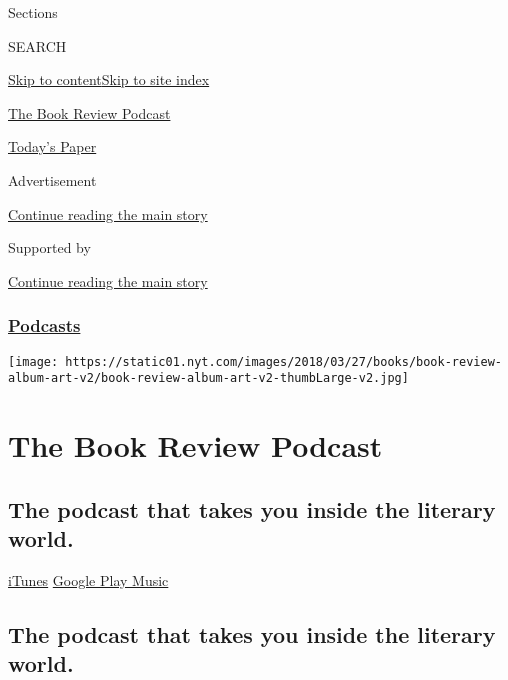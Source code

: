 Sections

SEARCH

\protect\hyperlink{site-content}{Skip to
content}\protect\hyperlink{site-index}{Skip to site index}

\href{https://www.nytimes.com/column/book-review-podcast}{The Book
Review Podcast}

\href{https://myaccount.nytimes.com/auth/login?response_type=cookie\&client_id=vi}{}

\href{https://www.nytimes.com/section/todayspaper}{Today's Paper}

Advertisement

\protect\hyperlink{after-top}{Continue reading the main story}

Supported by

\protect\hyperlink{after-sponsor}{Continue reading the main story}

\hypertarget{podcasts}{%
\subsubsection{\texorpdfstring{\href{/spotlight/podcasts}{Podcasts}}{Podcasts}}\label{podcasts}}

\texttt{[image: https://static01.nyt.com/images/2018/03/27/books/book-review-album-art-v2/book-review-album-art-v2-thumbLarge-v2.jpg]}

\hypertarget{the-book-review-podcast}{%
\section{The Book Review Podcast}\label{the-book-review-podcast}}

\hypertarget{the-podcast-that-takes-you-inside-the-literary-world}{%
\subsection{The podcast that takes you inside the literary
world.}\label{the-podcast-that-takes-you-inside-the-literary-world}}

\href{https://itunes.apple.com/us/podcast/book-review/id120315179?mt=2}{iTunes}
\textbar{}
\href{https://play.google.com/music/listen?u=0\#/ps/Iv6zeb5qwjtzjfbyo3vy5zny5ky}{Google
Play Music}

\hypertarget{the-podcast-that-takes-you-inside-the-literary-world-1}{%
\subsection{The podcast that takes you inside the literary
world.}\label{the-podcast-that-takes-you-inside-the-literary-world-1}}

